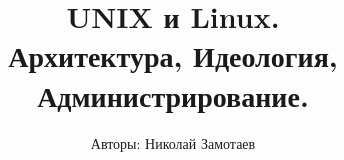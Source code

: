 \begin{titlepage}
\title{\Huge \textbf{UNIX и Linux. \\ Архитектура, Идеология, \\ Администрирование.}}
\author{Авторы: Николай Замотаев}
\maketitle

\end{titlepage}

